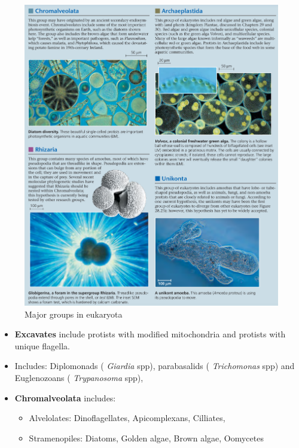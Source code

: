 \documentclass[ignorenonframetext,aspectratio=169]{beamer}
\providecommand{\tightlist}{%
  \setlength{\itemsep}{0pt}\setlength{\parskip}{0pt}}
\begin{document}
\begin{frame}{}
\protect\hypertarget{section-16}{}

\begin{figure}
\includegraphics[width=0.45\linewidth]{./../images/eukaryotic_groups_four} \caption{Major groups in eukaryota}\label{fig:eukaryotes-groups}
\end{figure}

\end{frame}

\begin{frame}{}
\protect\hypertarget{section-17}{}

\begin{itemize}
\tightlist
\item
  \textbf{Excavates} include protists with modified mitochondria and
  protists with unique flagella.
\item
  Includes: Diplomonads ( \emph{Giardia} spp), parabasalids (
  \emph{Trichomonas} spp) and Euglenozoans ( \emph{Trypanosoma} spp),
\item
  \textbf{Chromalveolata} includes:

  \begin{itemize}
  \tightlist
  \item
    Alvelolates: Dinoflagellates, Apicomplexans, Cilliates,
  \item
    Stramenopiles: Diatoms, Golden algae, Brown algae, Oomycetes
  \end{itemize}
\end{itemize}

\end{frame}
\end{document}

